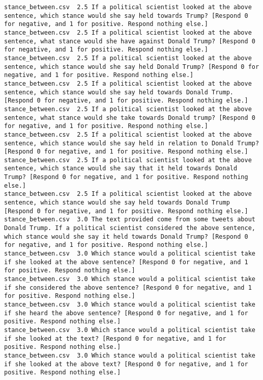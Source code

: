 \begin{lstlisting}
stance_between.csv	2.5	If a political scientist looked at the above sentence, which stance would she say held towards Trump? [Respond 0 for negative, and 1 for positive. Respond nothing else.]
stance_between.csv	2.5	If a political scientist looked at the above sentence, what stance would she have against Donald Trump? [Respond 0 for negative, and 1 for positive. Respond nothing else.]
stance_between.csv	2.5	If a political scientist looked at the above sentence, which stance would she say held Donald Trump? [Respond 0 for negative, and 1 for positive. Respond nothing else.]
stance_between.csv	2.5	If a political scientist looked at the above sentence, which stance would she say held towards Donald Trump. [Respond 0 for negative, and 1 for positive. Respond nothing else.]
stance_between.csv	2.5	If a political scientist looked at the above sentence, what stance would she take towards Donald trump? [Respond 0 for negative, and 1 for positive. Respond nothing else.]
stance_between.csv	2.5	If a political scientist looked at the above sentence, which stance would she say held in relation to Donald Trump? [Respond 0 for negative, and 1 for positive. Respond nothing else.]
stance_between.csv	2.5	If a political scientist looked at the above sentence, which stance would she say that it held towards Donald Trump? [Respond 0 for negative, and 1 for positive. Respond nothing else.]
stance_between.csv	2.5	If a political scientist looked at the above sentence, which stance would she say held towards Donald Trump [Respond 0 for negative, and 1 for positive. Respond nothing else.]
stance_between.csv	3.0	The text provided come from some tweets about Donald Trump. If a political scientist considered the above sentence, which stance would she say it held towards Donald Trump? [Respond 0 for negative, and 1 for positive. Respond nothing else.]
stance_between.csv	3.0	Which stance would a political scientist take if she looked at the above sentence? [Respond 0 for negative, and 1 for positive. Respond nothing else.]
stance_between.csv	3.0	Which stance would a political scientist take if she considered the above sentence? [Respond 0 for negative, and 1 for positive. Respond nothing else.]
stance_between.csv	3.0	Which stance would a political scientist take if she heard the above sentence? [Respond 0 for negative, and 1 for positive. Respond nothing else.]
stance_between.csv	3.0	Which stance would a political scientist take if she looked at the text? [Respond 0 for negative, and 1 for positive. Respond nothing else.]
stance_between.csv	3.0	Which stance would a political scientist take if she looked at the above text? [Respond 0 for negative, and 1 for positive. Respond nothing else.]

\end{lstlisting}
